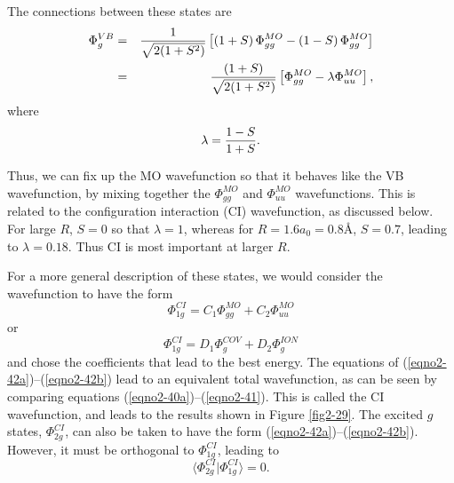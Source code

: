 The connections between these states are
\begin{eqnarray}
\Phi^{VB}_g &=& {1 \over \sqrt{2(1+S^2)}} \left[ \left( 1 + S \right) 
\Phi^{MO}_{gg} - \left( 1 - S \right) \Phi^{MO}_{gg} \right]\cr
&=& {(1+S) \over \sqrt{2(1+S^2)}} \left[ \Phi^{MO}_{gg} - \lambda 
\Phi^{MO}_{uu} \right],
\end{eqnarray}
where
\begin{equation}
\lambda = {1 - S \over 1 + S} .
\end{equation}

Thus, we can fix up the MO wavefunction so that it behaves like the VB
wavefunction, by mixing together the $\Phi^{MO}_{gg}$ and
$\Phi^{MO}_{uu}$ wavefunctions. This is related to the configuration
interaction (CI) wavefunction, as discussed below.  For large $R$, $S
= 0$ so that $\lambda = 1$, whereas for $R = 1.6a_0 = 0.8$\AA, $S =
0.7$, leading to $\lambda = 0.18$. Thus CI is most important at larger
$R$.

For a more general description of these states, we would consider the
wavefunction to have the form
\begin{equation}
\Phi^{CI}_{1g} = C_1 \Phi^{MO}_{gg} + C_2 \Phi^{MO}_{uu}
\label{eqno2-42a}
\end{equation}
or
\begin{equation}
\Phi^{CI}_{1g} = D_1 \Phi^{COV}_{g} + D_2 \Phi^{ION}_g
\label{eqno2-42b}
\end{equation}
and chose the coefficients that lead to the best energy. The equations
of (\ref{eqno2-42a})--(\ref{eqno2-42b}) lead to an equivalent total
wavefunction, as can be seen by comparing equations
(\ref{eqno2-40a})--(\ref{eqno2-41}). This is
called the CI wavefunction, and leads to
the results shown in Figure \ref{fig2-29}. The excited $g$ states,
$\Phi^{CI}_{2g}$, can also be taken to have the form
(\ref{eqno2-42a})--(\ref{eqno2-42b}). However, it must be orthogonal
to $\Phi^{CI}_{1g}$, leading to
\begin{equation}
\langle \Phi^{CI}_{2g} \vert \Phi^{CI}_{1g} \rangle = 0 .
\end{equation}

